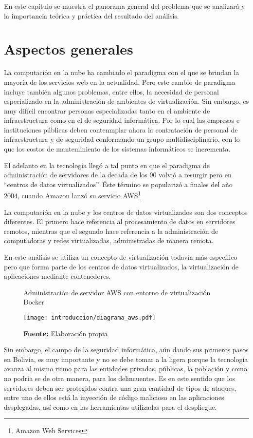 \documentclass[../main/main.tex]{subfiles}
\begin{document}
\espacio

  En este capítulo se muestra el panorama general del problema que se analizará y la importancia teórica y práctica del resultado del análisis.

  \section{Aspectos generales}

  La computación en la nube ha cambiado el paradigma con el que se brindan la mayoría de los servicios web en la actualidad. Pero este cambio de paradigma incluye también algunos problemas, entre ellos, la necesidad de personal especializado en la administración de ambientes de virtualización. Sin embargo, es muy difícil encontrar personas especializadas tanto en el ambiente de infraestructura como en el de seguridad informática. Por lo cual las empresas e instituciones públicas deben contenmplar ahora la contratación de personal de infraestructura y de seguridad conformando un grupo multidisciplinario, con lo que los costos de manteminiento de los sistemas informáticos se incrementa.

  El adelanto en la tecnología llegó a tal punto en que el paradigma de administración de servidores de la decada de los 90 volvió a resurgir pero en ``centros de datos virtualizados''. Éste término se popularizó a finales del año 2004, cuando Amazon lanzó su servicio AWS\footnote{Amazon Web Services}

  La computación en la nube y los centros de datos virtualizados son dos conceptos diferentes. El primero hace referencia al procesamiento de datos en servidores remotos, mientras que el segundo hace referencia a la administración de computadoras y redes virtualizadas, administradas de manera remota.

  En este análisis se utiliza un concepto de virtualización todavía más específico pero que forma parte de los centros de datos virtualizados, la virtualización de aplicaciones mediante contenedores.

  \begin{figure}[ht]
    \centering
    \caption{Administración de servidor AWS con entorno de virtualización Docker}
    \texttt{[image: introduccion/diagrama\_aws.pdf]}
    \caption*{\textbf{Fuente:} Elaboración propia}
  \end{figure}

  Sin embargo, el campo de la seguridad informática, aún dando sus primeros pasos en Bolivia, es muy importante y no se debe tomar a la ligera porque la tecnología avanza al mismo ritmo para las entidades privadas, públicas, la población y como no podría se de otra manera, para los delincuentes. Es en este sentido que los servidores deben ser protegidos contra una gran cantidad de tipos de ataques, entre uno de ellos está la inyección de código malicioso en las aplicaciones desplegadas, así como en las herramientas utilizadas para el despliegue.
\end{document}
